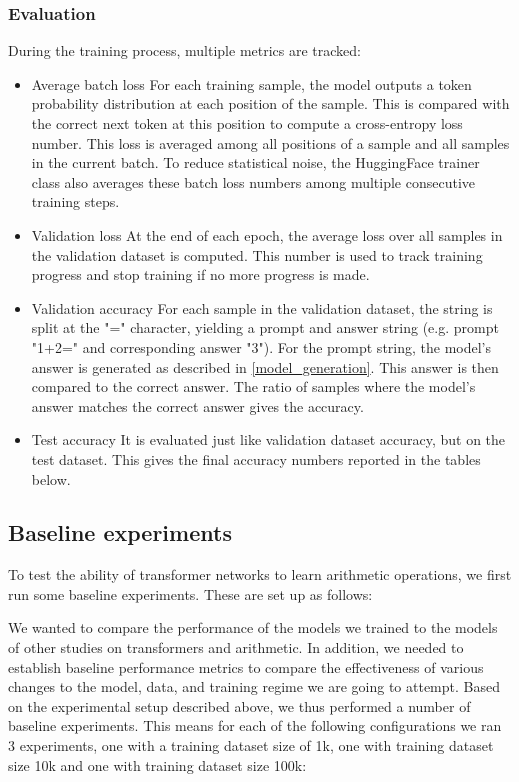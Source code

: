 \subsubsection{Evaluation}

During the training process, multiple metrics are tracked:

\begin{itemize}
	\item{Average batch loss}
	For each training sample, the model outputs a token probability distribution at each position of the sample. This is compared with the correct next token at this position to compute a cross-entropy loss number. This loss is averaged among all positions of a sample and all samples in the current batch. To reduce statistical noise, the HuggingFace trainer class also averages these batch loss numbers among multiple consecutive training steps.
	
	\item{Validation loss}
	At the end of each epoch, the average loss over all samples in the validation dataset is computed. This number is used to track training progress and stop training if no more progress is made.
	
	\item{Validation accuracy}
	For each sample in the validation dataset, the string is split at the "=" character, yielding a prompt and answer string (e.g. prompt "1+2=" and corresponding answer "3"). For the prompt string, the model's answer is generated as described in \cref{model_generation}. This answer is then compared to the correct answer. The ratio of samples where the model's answer matches the correct answer gives the accuracy.
	
	\item{Test accuracy}
	It is evaluated just like validation dataset accuracy, but on the test dataset. This gives the final accuracy numbers reported in the tables below.
\end{itemize}





\subsection{Baseline experiments}

To test the ability of transformer networks to learn arithmetic operations, we first run some baseline experiments. These are set up as follows:

We wanted to compare the performance of the models we trained to the models of other studies on transformers and arithmetic. In addition, we needed to establish baseline performance metrics to compare the effectiveness of various changes to the model, data, and training regime we are going to attempt.
Based on the experimental setup described above, we thus performed a number of baseline experiments. This means for each of the following configurations we ran 3 experiments, one with a training dataset size of 1k, one with training dataset size 10k and one with training dataset size 100k:


